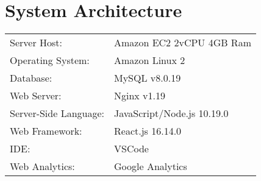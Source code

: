 \section{System Architecture}

\begin{tabular}{ l l }
Server Host:			& Amazon EC2 2vCPU 4GB Ram\\
Operating System:		& Amazon Linux 2\\
Database:				& MySQL v8.0.19\\
Web Server:				& Nginx v1.19\\
Server-Side Language:	& JavaScript/Node.js 10.19.0\\
Web Framework:			& React.js 16.14.0\\
IDE:					& VSCode\\
Web Analytics:			& Google Analytics
\end{tabular}